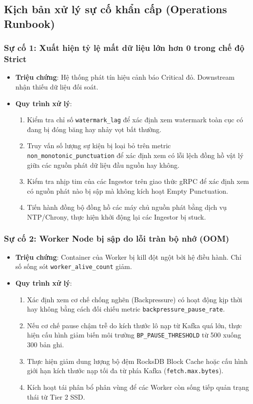 \documentclass[12pt,a4paper]{article}
\begin{document}
\subsection{Kịch bản xử lý sự cố khẩn cấp (Operations Runbook)}

\subsubsection{Sự cố 1: Xuất hiện tỷ lệ mất dữ liệu lớn hơn 0 trong chế độ Strict}
\begin{itemize}
    \item \textbf{Triệu chứng}: Hệ thống phát tín hiệu cảnh báo Critical đỏ. Downstream nhận thiếu dữ liệu đối soát.
    \item \textbf{Quy trình xử lý}:
        \begin{enumerate}
            \item Kiểm tra chỉ số \texttt{watermark\_lag} để xác định xem watermark toàn cục có đang bị đóng băng hay nhảy vọt bất thường.
            \item Truy vấn số lượng sự kiện bị loại bỏ trên metric \texttt{non\_monotonic\_punctuation} để xác định xem có lỗi lệch đồng hồ vật lý giữa các nguồn phát dữ liệu đầu nguồn hay không.
            \item Kiểm tra nhịp tim của các Ingestor trên giao thức gRPC để xác định xem có nguồn phát nào bị sập mà không kích hoạt Empty Punctuation.
            \item Tiến hành đồng bộ đồng hồ các máy chủ nguồn phát bằng dịch vụ NTP/Chrony, thực hiện khởi động lại các Ingestor bị stuck.
        \end{enumerate}
\end{itemize}

\subsubsection{Sự cố 2: Worker Node bị sập do lỗi tràn bộ nhớ (OOM)}
\begin{itemize}
    \item \textbf{Triệu chứng}: Container của Worker bị kill đột ngột bởi hệ điều hành. Chỉ số sống sót \texttt{worker\_alive\_count} giảm.
    \item \textbf{Quy trình xử lý}:
        \begin{enumerate}
            \item Xác định xem cơ chế chống nghẽn (Backpressure) có hoạt động kịp thời hay không bằng cách đối chiếu metric \texttt{backpressure\_pause\_rate}.
            \item Nếu cơ chế pause chậm trễ do kích thước lô nạp từ Kafka quá lớn, thực hiện cấu hình giảm biến môi trường \texttt{BP\_PAUSE\_THRESHOLD} từ 500 xuống 300 bản ghi.
            \item Thực hiện giảm dung lượng bộ đệm RocksDB Block Cache hoặc cấu hình giới hạn kích thước nạp tối đa từ phía Kafka (\texttt{fetch.max.bytes}).
            \item Kích hoạt tái phân bổ phân vùng để các Worker còn sống tiếp quản trạng thái từ Tier 2 SSD.
        \end{enumerate}
\end{itemize}
\end{document}
